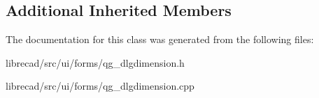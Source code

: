 \subsection*{Additional Inherited Members}


The documentation for this class was generated from the following files\-:\begin{DoxyCompactItemize}
\item 
librecad/src/ui/forms/qg\-\_\-dlgdimension.\-h\item 
librecad/src/ui/forms/qg\-\_\-dlgdimension.\-cpp\end{DoxyCompactItemize}
